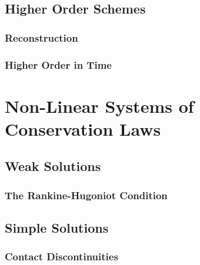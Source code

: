 \documentclass[
  fourColumns,
  landscape
]{formularyETH/formularyETH}
\begin{document}
\subsection{Higher Order Schemes}\label{subsec:higher_order_schemes}
  
  \subsubsection{Reconstruction}\label{subsec:reconstruction_systems}
    
  \subsubsection{Higher Order in Time}
    
\vfill\newpage
\section{Non-Linear Systems of Conservation Laws}\label{sec:non-linear_systems_of_conservation_laws}
    
    \subsection{Weak Solutions}\label{subsec:weak_solutions}
      
      \subsubsection{The Rankine-Hugoniot Condition}
      
    \subsection{Simple Solutions}\label{subsec:name}
      
      \subsubsection{Contact Discontinuities}\label{subsubsec:contact_discontinuities}
        
\end{document}
